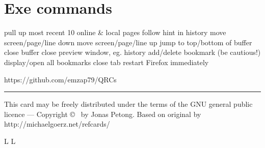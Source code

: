 \section{Exe commands}{}
	{pull up most recent 10 online \& local pages}
	{follow hint in history}
	{move screen/page/line down}
	{move screen/page/line up}
	{jump to top/bottom of buffer}
	{close buffer}
	{close preview window, eg. history}
	{add/delete bookmark (be cautious!)}
	{display/open all bookmarks}
	{close tab}
	{restart Firefox immediately}

\vfill
{\smalltt https://github.com/emzap79/QRCs}
\hrule
\smallskip
{\smallrm This card may be freely distributed under
    the terms of the GNU general public licence ---
        Copyright \copyright\ {} by Jonas Petong.
        Based on original by {\smalltt http://michaelgoerz.net/refcards/}
}

\vfil
\supereject
\if L\lr \else\null\vfill\eject\fi
\if L\lr \else\null\vfill\eject\fi
\bye

